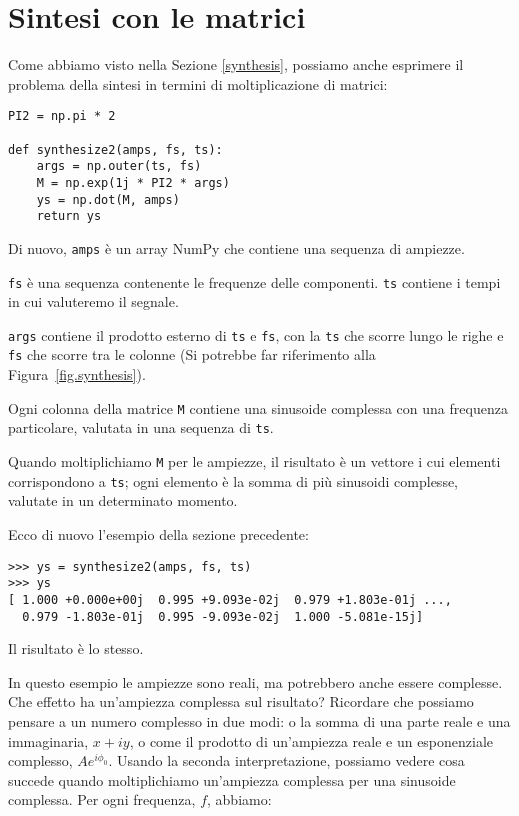 \documentclass[12pt,a4paper]{book}
\begin{document}
\section{Sintesi con le matrici} \label{synthmat} 

Come abbiamo visto nella Sezione \ref{synthesis}, possiamo anche esprimere il problema della sintesi in termini di moltiplicazione di matrici:

\begin{verbatim} 
PI2 = np.pi * 2

def synthesize2(amps, fs, ts):
    args = np.outer(ts, fs)
    M = np.exp(1j * PI2 * args)
    ys = np.dot(M, amps)
    return ys
 \end{verbatim} 

Di nuovo, {\tt amps} è un array NumPy che contiene una sequenza di ampiezze.

{\tt fs} è una sequenza contenente le frequenze delle componenti. {\tt ts} contiene i tempi in cui valuteremo il segnale.

{\tt args} contiene il prodotto esterno di {\tt ts} e {\tt fs}, con la {\tt ts} che scorre lungo le righe e {\tt fs} che scorre tra le colonne (Si potrebbe far riferimento alla Figura~\ref{fig.synthesis}).

Ogni colonna della matrice {\tt M} contiene una sinusoide complessa con una frequenza particolare, valutata in una sequenza di {\tt ts}.

Quando moltiplichiamo {\tt M} per le ampiezze, il risultato è un vettore i cui elementi corrispondono a {\tt ts}; ogni elemento è la somma di più sinusoidi complesse, valutate in un determinato momento.

Ecco di nuovo l'esempio della sezione precedente:

\begin{verbatim} 
>>> ys = synthesize2(amps, fs, ts)
>>> ys
[ 1.000 +0.000e+00j  0.995 +9.093e-02j  0.979 +1.803e-01j ...,
  0.979 -1.803e-01j  0.995 -9.093e-02j  1.000 -5.081e-15j]
 \end{verbatim} 

Il risultato è lo stesso.

In questo esempio le ampiezze sono reali, ma potrebbero anche essere complesse. Che effetto ha un'ampiezza complessa sul risultato? Ricordare che possiamo pensare a un numero complesso in due modi: o la somma di una parte reale e una immaginaria, $x + i y$, o come il prodotto di un'ampiezza reale e un esponenziale complesso, $A e^{i \phi_0}$. Usando la seconda interpretazione, possiamo vedere cosa succede quando moltiplichiamo un'ampiezza complessa per una sinusoide complessa. Per ogni frequenza, $f$, abbiamo:
\end{document}
